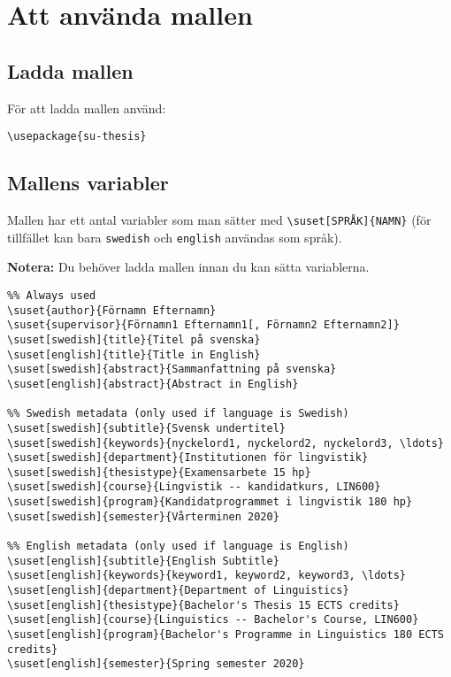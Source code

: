 
\section{Att använda mallen}
\label{mallen}


\subsection{Ladda mallen}
\label{variabler}

För att ladda mallen använd:

\begin{verbatim}
\usepackage{su-thesis}
\end{verbatim}

\subsection{Mallens variabler}
\label{variabler}

Mallen har ett antal variabler som man sätter med \verb|\suset[SPRÅK]{NAMN}|
(för tillfället kan bara \texttt{swedish} och \texttt{english} användas som
språk).

\textbf{Notera:} Du behöver ladda mallen innan du kan sätta variablerna.

\begin{verbatim}
%% Always used
\suset{author}{Förnamn Efternamn}
\suset{supervisor}{Förnamn1 Efternamn1[, Förnamn2 Efternamn2]}
\suset[swedish]{title}{Titel på svenska}
\suset[english]{title}{Title in English}
\suset[swedish]{abstract}{Sammanfattning på svenska}
\suset[english]{abstract}{Abstract in English}

%% Swedish metadata (only used if language is Swedish)
\suset[swedish]{subtitle}{Svensk undertitel}
\suset[swedish]{keywords}{nyckelord1, nyckelord2, nyckelord3, \ldots}
\suset[swedish]{department}{Institutionen för lingvistik}
\suset[swedish]{thesistype}{Examensarbete 15 hp}
\suset[swedish]{course}{Lingvistik -- kandidatkurs, LIN600}
\suset[swedish]{program}{Kandidatprogrammet i lingvistik 180 hp}
\suset[swedish]{semester}{Vårterminen 2020}

%% English metadata (only used if language is English)
\suset[english]{subtitle}{English Subtitle}
\suset[english]{keywords}{keyword1, keyword2, keyword3, \ldots}
\suset[english]{department}{Department of Linguistics}
\suset[english]{thesistype}{Bachelor's Thesis 15 ECTS credits}
\suset[english]{course}{Linguistics -- Bachelor's Course, LIN600}
\suset[english]{program}{Bachelor's Programme in Linguistics 180 ECTS credits}
\suset[english]{semester}{Spring semester 2020}
\end{verbatim}


